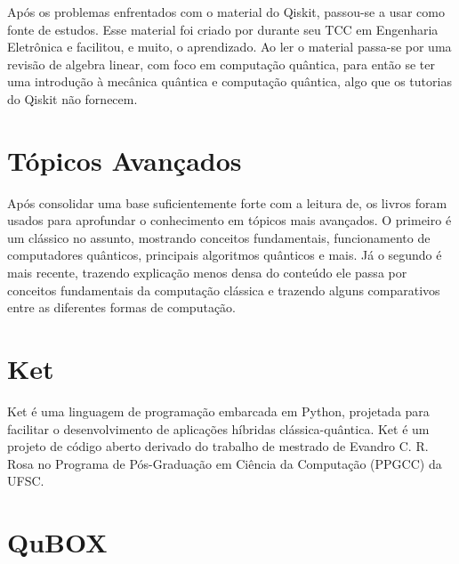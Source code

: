 Após os problemas enfrentados com o material do Qiskit, passou-se a usar\cite{giovani} como fonte de estudos.
Esse material foi criado por \citeauthor{giovani} durante seu TCC em Engenharia Eletrônica e facilitou, e muito, o aprendizado.
Ao ler o material passa-se por uma revisão de algebra linear, com foco em computação quântica, para então se ter uma introdução à mecânica quântica e computação quântica, algo que os tutorias do Qiskit não fornecem.

\section{Tópicos Avançados}\label{sec:topicos-avancados}

Após consolidar uma base suficientemente forte com a leitura de\cite{giovani}, os livros\cite{nielsen_chuang_2010, thomas-wong} foram usados para aprofundar o conhecimento em tópicos mais avançados.
O primeiro é um clássico no assunto, mostrando conceitos fundamentais, funcionamento de computadores quânticos, principais algoritmos quânticos e mais.
Já o segundo é mais recente, trazendo explicação menos densa do conteúdo ele passa por conceitos fundamentais da computação clássica e trazendo alguns comparativos entre as diferentes formas de computação.

\section{Ket}\label{sec:ket}

Ket é uma linguagem de programação embarcada em Python, projetada para facilitar o desenvolvimento de aplicações híbridas clássica-quântica.
Ket é um projeto de código aberto derivado do trabalho de mestrado de Evandro C. R. Rosa no Programa de Pós-Graduação em Ciência da Computação (PPGCC) da UFSC.

\section{QuBOX}\label{sec:qubox}